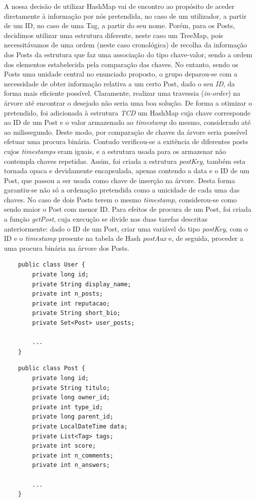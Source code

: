 \documentclass[a4paper, 11pt, oneside]{article}
\begin{document}
A nossa decisão de utilizar HashMap vai de encontro ao propósito de aceder diretamente à informação por nós pretendida, no caso de um utilizador, a partir de um ID, no caso
de uma Tag, a partir do seu nome. Porém, para os Posts, decidimos utilizar uma estrutura diferente, neste caso um TreeMap, pois necessitávamos de uma ordem (neste caso 
cronológica) de recolha da informação dos Posts da estrutura que faz uma associação do tipo chave-valor, sendo a ordem dos elementos estabelecida pela comparação das chaves. 
No entanto, sendo os Posts uma unidade central no enunciado proposto, o grupo deparou-se com a necessidade de obter informação relativa a um certo Post, dado o seu \textit{ID}, 
da forma mais eficiente possível. Claramente, realizar uma travessia (\textit{in-order}) na árvore até encontrar o desejado não seria uma boa solução. De forma a otimizar o 
pretendido, foi adicionada à estrutura \textit{TCD} um HashMap cuja chave corresponde ao ID de um Post e o valor armazenado ao \textit{timestamp} do mesmo, considerado até ao 
milissegundo. Deste modo, por comparação de chaves da árvore seria possível efetuar uma procura binária. Contudo verificou-se a exitência de diferentes posts cujos \textit{
timestamps} eram iguais, e a estrutura usada para os armazenar não contempla chaves repetidas. Assim, foi criada a estrutura \textit{postKey}, também esta tornada opaca e 
devidamente encapsulada, apenas contendo a data e o ID de um Post, que passou a ser usada como chave de inserção na árvore. Desta forma garantiu-se não só a ordenação pretendida 
como a unicidade de cada uma das chaves. No caso de dois Posts terem o mesmo \textit{timestamp}, considerou-se como sendo maior o Post com menor ID. Para efeitos de procura de 
um Post, foi criada a função \textit{getPost}, cuja execução se divide nas duas tarefas descritas anteriormente: dado o ID de um Post, criar uma variável do tipo 
\textit{postKey}, com o ID e o \textit{timestamp} presente na tabela de Hash \textit{postAux} e, de seguida, proceder a uma procura binária na árvore dos Posts.


\begin{lstlisting}
	public class User {	
	    private long id;
	    private String display_name;
	    private int n_posts;
	    private int reputacao;
	    private String short_bio;
	    private Set<Post> user_posts;

	    ...
	}
\end{lstlisting}

\begin{lstlisting}
	public class Post {
	    private long id;
	    private String titulo;
	    private long owner_id;
	    private int type_id;
	    private long parent_id;
	    private LocalDateTime data;
	    private List<Tag> tags;
	    private int score;
	    private int n_comments;
	    private int n_answers;

	    ...
	}
\end{lstlisting}
\end{document}
